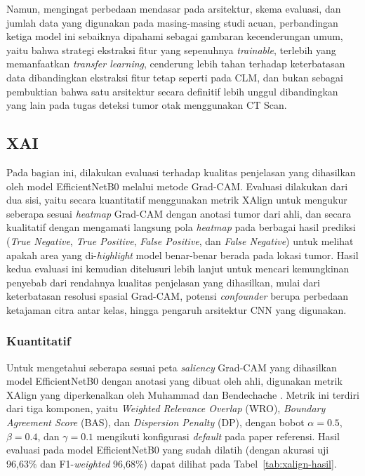 Namun, mengingat perbedaan mendasar pada arsitektur, skema evaluasi, dan jumlah data yang digunakan pada masing-masing studi acuan, perbandingan ketiga model ini sebaiknya dipahami sebagai gambaran kecenderungan umum, yaitu bahwa strategi ekstraksi fitur yang sepenuhnya \textit{trainable}, terlebih yang memanfaatkan \textit{transfer learning}, cenderung lebih tahan terhadap keterbatasan data dibandingkan ekstraksi fitur tetap seperti pada CLM, dan bukan sebagai pembuktian bahwa satu arsitektur secara definitif lebih unggul dibandingkan yang lain pada tugas deteksi tumor otak menggunakan CT Scan.

\subsection{XAI}
Pada bagian ini, dilakukan evaluasi terhadap kualitas penjelasan yang dihasilkan oleh model EfficientNetB0 melalui metode Grad-CAM. Evaluasi dilakukan dari dua sisi, yaitu secara kuantitatif menggunakan metrik XAlign untuk mengukur seberapa sesuai \textit{heatmap} Grad-CAM dengan anotasi tumor dari ahli, dan secara kualitatif dengan mengamati langsung pola \textit{heatmap} pada berbagai hasil prediksi (\textit{True Negative}, \textit{True Positive}, \textit{False Positive}, dan \textit{False Negative}) untuk melihat apakah area yang di-\textit{highlight} model benar-benar berada pada lokasi tumor. Hasil kedua evaluasi ini kemudian ditelusuri lebih lanjut untuk mencari kemungkinan penyebab dari rendahnya kualitas penjelasan yang dihasilkan, mulai dari keterbatasan resolusi spasial Grad-CAM, potensi \textit{confounder} berupa perbedaan ketajaman citra antar kelas, hingga pengaruh arsitektur CNN yang digunakan.
\subsubsection{Kuantitatif}

Untuk mengetahui seberapa sesuai peta \textit{saliency} Grad-CAM yang dihasilkan model EfficientNetB0 dengan anotasi yang dibuat oleh ahli, digunakan metrik XAlign yang diperkenalkan oleh Muhammad dan Bendechache \cite{muhammad2025heatmap}. Metrik ini terdiri dari tiga komponen, yaitu \textit{Weighted Relevance Overlap} (WRO), \textit{Boundary Agreement Score} (BAS), dan \textit{Dispersion Penalty} (DP), dengan bobot $\alpha = 0.5$, $\beta = 0.4$, dan $\gamma = 0.1$ mengikuti konfigurasi \textit{default} pada paper referensi. Hasil evaluasi pada model EfficientNetB0 yang sudah dilatih (dengan akurasi uji 96,63\% dan F1-\textit{weighted} 96,68\%) dapat dilihat pada Tabel~\ref{tab:xalign-hasil}.

